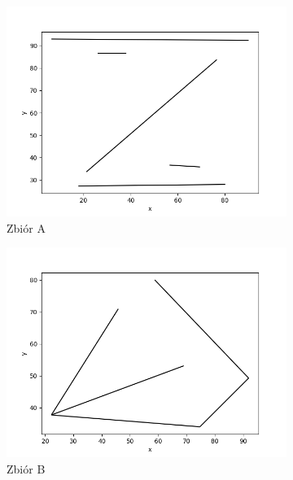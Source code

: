 \documentclass[11pt,a4paper]{article}
\begin{document}
\begin{figure}[H]
    \centering
    \begin{subfigure}[b]{0.46\textwidth}
        \centering
        \includegraphics[scale=0.4]{res/figs/test_a.png}
        \caption{
            Zbiór A
        }
    \end{subfigure}
    \begin{subfigure}[b]{0.46\textwidth}
        \centering
        \includegraphics[scale=0.4]{res/figs/test_b.png}
        \caption{
            Zbiór B
        }
    \end{subfigure}
    \begin{subfigure}[b]{0.46\textwidth}
        \centering

\end{subfigure}
\end{figure}
\end{document}
